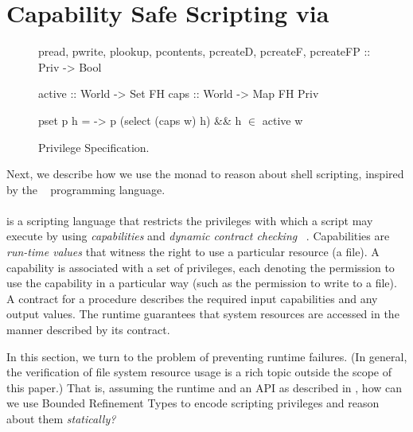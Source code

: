 \section{Capability Safe Scripting via \RIO}
\label{sec:files}\label{subsec:state:files}

\begin{figure}[t]
\begin{mcode}
pread, pwrite, plookup, pcontents,
pcreateD, pcreateF, pcreateFP :: Priv -> Bool

active   :: World -> Set FH 
caps     :: World -> Map FH Priv

pset p h = \w -> p (select (caps w) h) && 
                 h $\in$ active w
\end{mcode}
\caption{Privilege Specification.}
\label{fig:fstypes} 
\end{figure}


Next, we describe how we use the \RIO monad to reason about shell
scripting, inspired by the \shill~\citep{shill} programming language.
%

\paragraph{\shill} is a scripting language that restricts the
privileges with which a script may execute by using
\emph{capabilities} and \emph{dynamic contract checking}~\citep{shill} .
%
Capabilities are \emph{run-time values} 
that witness the right to use a particular resource 
(\eg a file).
%
A capability is associated with a set of privileges, 
each denoting the permission to use the capability 
in a particular way (such as the permission to write 
to a file).
%
A contract for a \shill procedure describes the 
required input capabilities and any output values.
%
The \shill runtime guarantees that system resources are accessed in
the manner described by its contract.

In this section, we turn to the problem of
preventing \shill runtime failures.
%
(In general, the verification of file system resource usage is a rich
topic outside the scope of this paper.)
%
That is, assuming the \shill runtime and an API as described in
\cite{shill}, how can we use Bounded Refinement Types to encode
scripting privileges and reason about them \emph{statically?}

